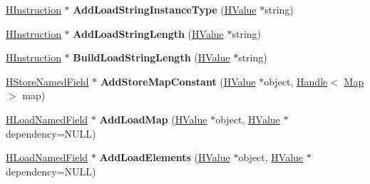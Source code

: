 \begin{DoxyCompactItemize}
\item 
\hyperlink{classv8_1_1internal_1_1_h_instruction}{H\+Instruction} $\ast$ {\bfseries Add\+Load\+String\+Instance\+Type} (\hyperlink{classv8_1_1internal_1_1_h_value}{H\+Value} $\ast$string)\hypertarget{classv8_1_1internal_1_1_h_graph_builder_a81cbe5546c74a422efc24b88265ceb95}{}\label{classv8_1_1internal_1_1_h_graph_builder_a81cbe5546c74a422efc24b88265ceb95}

\item 
\hyperlink{classv8_1_1internal_1_1_h_instruction}{H\+Instruction} $\ast$ {\bfseries Add\+Load\+String\+Length} (\hyperlink{classv8_1_1internal_1_1_h_value}{H\+Value} $\ast$string)\hypertarget{classv8_1_1internal_1_1_h_graph_builder_aeb778c809c8ca81cd1fe98fc886145a2}{}\label{classv8_1_1internal_1_1_h_graph_builder_aeb778c809c8ca81cd1fe98fc886145a2}

\item 
\hyperlink{classv8_1_1internal_1_1_h_instruction}{H\+Instruction} $\ast$ {\bfseries Build\+Load\+String\+Length} (\hyperlink{classv8_1_1internal_1_1_h_value}{H\+Value} $\ast$string)\hypertarget{classv8_1_1internal_1_1_h_graph_builder_a9937128602708338cd0dbb75bb564cc0}{}\label{classv8_1_1internal_1_1_h_graph_builder_a9937128602708338cd0dbb75bb564cc0}

\item 
\hyperlink{classv8_1_1internal_1_1_h_store_named_field}{H\+Store\+Named\+Field} $\ast$ {\bfseries Add\+Store\+Map\+Constant} (\hyperlink{classv8_1_1internal_1_1_h_value}{H\+Value} $\ast$object, \hyperlink{classv8_1_1internal_1_1_handle}{Handle}$<$ \hyperlink{classv8_1_1internal_1_1_map}{Map} $>$ map)\hypertarget{classv8_1_1internal_1_1_h_graph_builder_a2be176baccb6ad1afd834f28d8e6d3b1}{}\label{classv8_1_1internal_1_1_h_graph_builder_a2be176baccb6ad1afd834f28d8e6d3b1}

\item 
\hyperlink{classv8_1_1internal_1_1_h_load_named_field}{H\+Load\+Named\+Field} $\ast$ {\bfseries Add\+Load\+Map} (\hyperlink{classv8_1_1internal_1_1_h_value}{H\+Value} $\ast$object, \hyperlink{classv8_1_1internal_1_1_h_value}{H\+Value} $\ast$dependency=N\+U\+LL)\hypertarget{classv8_1_1internal_1_1_h_graph_builder_a8e09bec89c5877176bc979dc48f21dd5}{}\label{classv8_1_1internal_1_1_h_graph_builder_a8e09bec89c5877176bc979dc48f21dd5}

\item 
\hyperlink{classv8_1_1internal_1_1_h_load_named_field}{H\+Load\+Named\+Field} $\ast$ {\bfseries Add\+Load\+Elements} (\hyperlink{classv8_1_1internal_1_1_h_value}{H\+Value} $\ast$object, \hyperlink{classv8_1_1internal_1_1_h_value}{H\+Value} $\ast$dependency=N\+U\+LL)\hypertarget{classv8_1_1internal_1_1_h_graph_builder_a5263be8a91458439fd1c27c3b83b74f1}{}\label{classv8_1_1internal_1_1_h_graph_builder_a5263be8a91458439fd1c27c3b83b74f1}


\end{DoxyCompactItemize}
